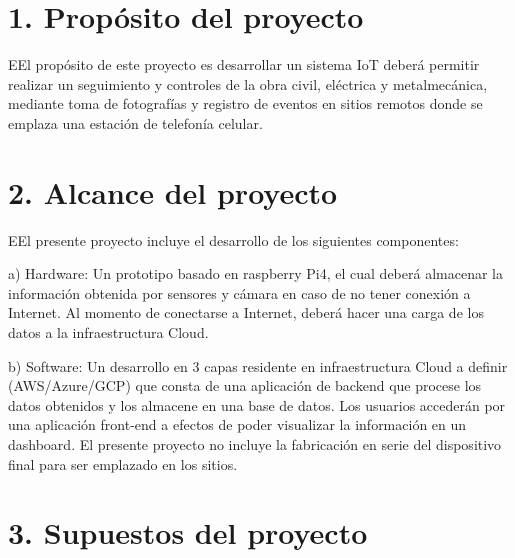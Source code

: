 \documentclass[11pt]{charter}
\begin{document}
\section{1. Propósito del proyecto}
\label{sec:proposito}

\begin{consigna}
EEl propósito de este proyecto es desarrollar un sistema IoT deberá permitir realizar un seguimiento y controles de la obra civil, eléctrica y metalmecánica, mediante toma de fotografías y registro de eventos en sitios remotos donde se emplaza una estación de telefonía celular.
\end{consigna}

\section{2. Alcance del proyecto}
\label{sec:alcance}

\begin{consigna}
EEl presente proyecto incluye el desarrollo de los siguientes componentes:
\item a) Hardware: Un prototipo basado en raspberry Pi4, el cual deberá almacenar la información obtenida por sensores y cámara en caso de no tener conexión a Internet. Al momento de  conectarse a Internet, deberá hacer una carga de los datos a la infraestructura Cloud.
\item b) Software: Un desarrollo en 3 capas residente en infraestructura Cloud a definir (AWS/Azure/GCP) que consta de una aplicación de backend que procese los datos obtenidos y los almacene en una base de datos.
Los usuarios accederán por una aplicación front-end a efectos de poder visualizar la información en un dashboard. 
El presente proyecto no incluye la fabricación en serie del dispositivo final para ser emplazado en los sitios.

\end{consigna}


\section{3. Supuestos del proyecto}
\label{sec:supuestos}
\end{document}
